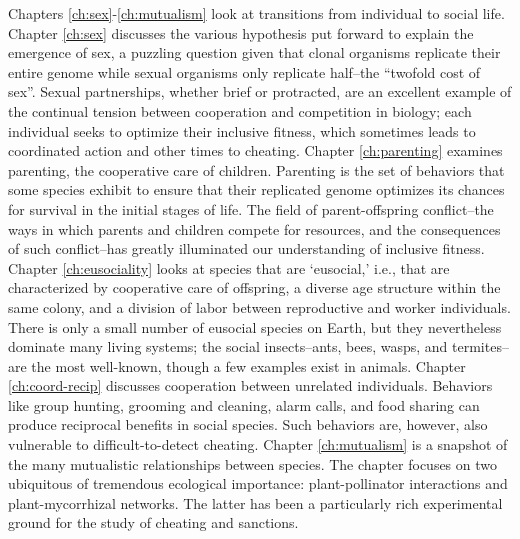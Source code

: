 \documentclass{tufte-book} %
\begin{document}
Chapters \ref{ch:sex}-\ref{ch:mutualism} look at transitions from individual to social life. Chapter \ref{ch:sex} discusses the various hypothesis put forward to explain the emergence of sex, a puzzling question given that clonal organisms replicate their entire genome while sexual organisms only replicate half--the ``twofold cost of sex''. Sexual partnerships, whether brief or protracted, are an excellent example of the continual tension between cooperation and competition in biology; each individual seeks to optimize their inclusive fitness, which sometimes leads to coordinated action and other times to cheating. Chapter \ref{ch:parenting} examines parenting, the cooperative care of children. Parenting is the set of behaviors that some species exhibit to ensure that their replicated genome optimizes its chances for survival in the initial stages of life. The field of parent-offspring conflict--the ways in which parents and children compete for resources, and the consequences of such conflict--has greatly illuminated our understanding of inclusive fitness. Chapter \ref{ch:eusociality} looks at species that are `eusocial,' i.e., that are characterized by cooperative care of offspring, a diverse age structure within the same colony, and a division of labor between reproductive and worker individuals. There is only a small number of eusocial species on Earth, but they nevertheless dominate many living systems; the social insects--ants, bees, wasps, and termites--are the most well-known, though a few examples exist in animals. Chapter \ref{ch:coord-recip} discusses cooperation between unrelated individuals. Behaviors like group hunting, grooming and cleaning, alarm calls, and food sharing can produce reciprocal benefits in social species. Such behaviors are, however, also vulnerable to difficult-to-detect cheating. Chapter \ref{ch:mutualism} is a snapshot of the many mutualistic relationships between species. The chapter focuses on two ubiquitous of tremendous ecological importance: plant-pollinator interactions and plant-mycorrhizal networks. The latter has been a particularly rich experimental ground for the study of cheating and sanctions.
\end{document}
